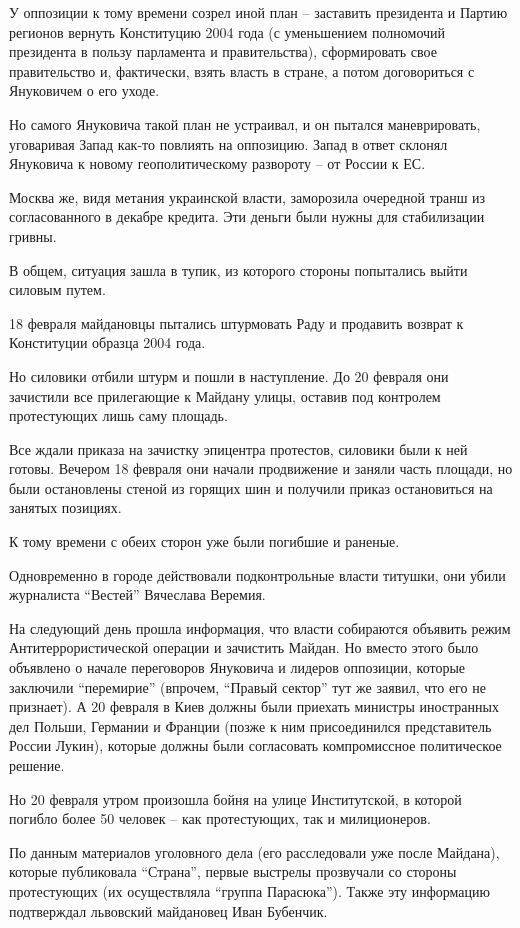У оппозиции к тому времени созрел иной план – заставить президента и
Партию регионов вернуть Конституцию 2004 года (с уменьшением полномочий
президента в пользу парламента и правительства), сформировать свое
правительство и, фактически, взять власть в стране, а потом договориться с
Януковичем о его уходе. 

Но самого Януковича такой план не устраивал, и он пытался маневрировать,
уговаривая Запад как-то повлиять на оппозицию. Запад в ответ склонял
Януковича к новому геополитическому развороту – от России к ЕС. 

Москва же, видя метания украинской власти, заморозила очередной транш из
согласованного в декабре кредита. Эти деньги были нужны для стабилизации
гривны.

В общем, ситуация зашла в тупик, из которого стороны попытались выйти
силовым путем.

18 февраля майдановцы пытались штурмовать Раду и продавить возврат к
Конституции образца 2004 года.

Но силовики отбили штурм и пошли в наступление. До 20 февраля они
зачистили все прилегающие к Майдану улицы, оставив под контролем
протестующих лишь саму площадь.

Все ждали приказа на зачистку эпицентра протестов, силовики были к ней
готовы. Вечером 18 февраля они начали продвижение и заняли часть площади,
но были остановлены стеной из горящих шин и получили приказ остановиться
на занятых позициях.

К тому времени с обеих сторон уже были погибшие и раненые.

Одновременно в городе действовали подконтрольные власти титушки, они убили
журналиста \enquote{Вестей} Вячеслава Веремия.

На следующий день прошла информация, что власти собираются объявить режим
Антитеррористической операции и зачистить Майдан. Но вместо этого было
объявлено о начале переговоров Януковича и лидеров оппозиции, которые
заключили \enquote{перемирие} (впрочем, \enquote{Правый сектор} тут же заявил, что его не
признает). А 20 февраля в Киев должны были приехать министры иностранных
дел Польши, Германии и Франции (позже к ним присоединился представитель
России Лукин), которые должны были согласовать компромиссное политическое
решение.

Но 20 февраля утром произошла бойня на улице Институтской, в которой
погибло более 50 человек – как протестующих, так и милиционеров.

По данным материалов уголовного дела (его расследовали уже после Майдана),
которые публиковала \enquote{Страна}, первые выстрелы прозвучали со стороны
протестующих (их осуществляла \enquote{группа Парасюка}). Также эту информацию
подтверждал львовский майдановец Иван Бубенчик. 

